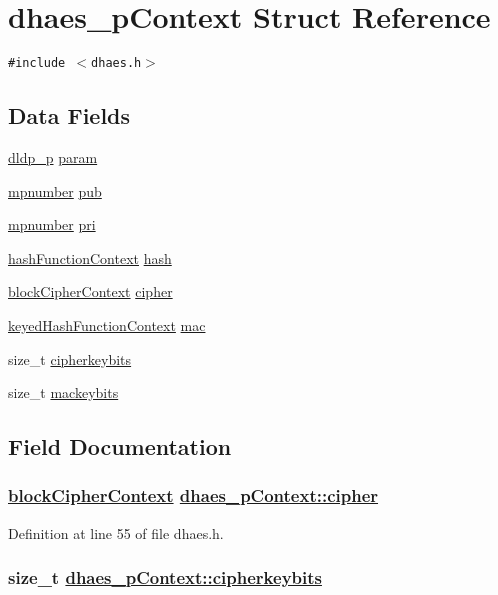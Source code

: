 \hypertarget{structdhaes__pContext}{
\section{dhaes\_\-p\-Context Struct Reference}
\label{structdhaes__pContext}
}
{\tt \#include $<$dhaes.h$>$}

\subsection*{Data Fields}
\begin{CompactItemize}
\item 
\hyperlink{structdldp__p}{dldp\_\-p} \hyperlink{structdhaes__pContext_o0}{param}
\item 
\hyperlink{structmpnumber}{mpnumber} \hyperlink{structdhaes__pContext_o1}{pub}
\item 
\hyperlink{structmpnumber}{mpnumber} \hyperlink{structdhaes__pContext_o2}{pri}
\item 
\hyperlink{structhashFunctionContext}{hash\-Function\-Context} \hyperlink{structdhaes__pContext_o3}{hash}
\item 
\hyperlink{structblockCipherContext}{block\-Cipher\-Context} \hyperlink{structdhaes__pContext_o4}{cipher}
\item 
\hyperlink{structkeyedHashFunctionContext}{keyed\-Hash\-Function\-Context} \hyperlink{structdhaes__pContext_o5}{mac}
\item 
size\_\-t \hyperlink{structdhaes__pContext_o6}{cipherkeybits}
\item 
size\_\-t \hyperlink{structdhaes__pContext_o7}{mackeybits}
\end{CompactItemize}


\subsection{Field Documentation}
\hypertarget{structdhaes__pContext_o4}{
\subsubsection[cipher]{\setlength{\rightskip}{0pt plus 5cm}\hyperlink{structblockCipherContext}{block\-Cipher\-Context} \hyperlink{structdhaes__pContext_o4}{dhaes\_\-p\-Context::cipher}}}
\label{structdhaes__pContext_o4}


Definition at line 55 of file dhaes.h.\hypertarget{structdhaes__pContext_o6}{
\subsubsection[cipherkeybits]{\setlength{\rightskip}{0pt plus 5cm}size\_\-t \hyperlink{structdhaes__pContext_o6}{dhaes\_\-p\-Context::cipherkeybits}}}
\label{structdhaes__pContext_o6}



